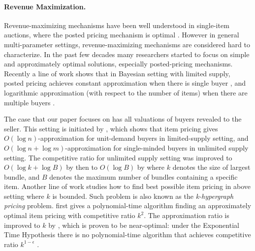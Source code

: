 \paragraph{Revenue Maximization.}
Revenue-maximizing mechanisms have been well understood in single-item auctions, where the posted pricing
mechanism is optimal \cite{myerson1981optimal}. 
However in general multi-parameter settings, revenue-maximizing mechanisms are considered
hard to characterize. In the past few decades many researchers started to 
focus on simple and approximately optimal solutions, especially posted-pricing mechanisms.
Recently a line of work shows that in Bayesian setting with limited supply, posted pricing achieves 
constant approximation when there is single buyer 
\cite{babaioff2014simple, chawla2007algorithmic, 
chawla2010multi, chawla2015power, rubinstein2015simple},
and logarithmic approximation (with respect to the number of items) when there are multiple buyers 
\cite{cai2016duality, chawla2016mechanism, caizhao2017duality}.

The case that our paper focuses on has all valuations of buyers revealed to the seller. This setting
is initiated by \cite{guruswami2005profit}, which shows that item pricing 
gives $O(\log n)$-approximation for unit-demand buyers
in limited-supply setting, and $O(\log n+\log m)$-approximation for single-minded buyers in unlimited supply
setting. The competitive ratio for unlimited supply setting was improved to $O(\log k + \log B)$ 
by \cite{briest2006single} then to $O(\log B)$ by \cite{cheung2008approximation} where 
$k$ denotes the size of largest bundle, and $B$ denotes the maximum number of bundles containing a specific item.
Another line of work studies how to find best possible item pricing in above setting where $k$ is bounded. Such problem 
is also known as the \textit{k-hypergraph pricing} problem.
\cite{briest2006single} first gives a polynomial-time algorithm finding an approximately optimal item pricing
with competitive ratio $k^2$. The approximation ratio is improved to $k$ by \cite{balcan2006approximation},
which is proven to be near-optimal: under the Exponential Time Hypothesis there is no polynomial-time algorithm 
that achieves competitive ratio $k^{1-\epsilon}$ \cite{chalermsook2013independent}.

